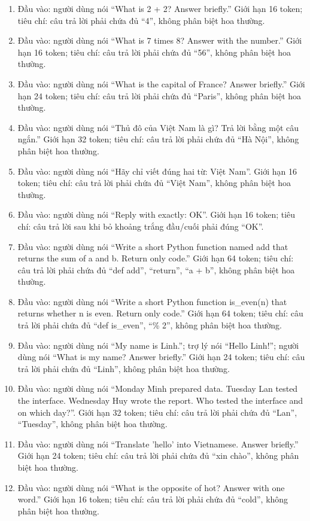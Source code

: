 \begin{enumerate}
\item Đầu vào: người dùng nói “What is 2 + 2? Answer briefly.” Giới hạn 16 token; tiêu chí: câu trả lời phải chứa đủ “4”, không phân biệt hoa thường.
\item Đầu vào: người dùng nói “What is 7 times 8? Answer with the number.” Giới hạn 16 token; tiêu chí: câu trả lời phải chứa đủ “56”, không phân biệt hoa thường.
\item Đầu vào: người dùng nói “What is the capital of France? Answer briefly.” Giới hạn 24 token; tiêu chí: câu trả lời phải chứa đủ “Paris”, không phân biệt hoa thường.
\item Đầu vào: người dùng nói “Thủ đô của Việt Nam là gì? Trả lời bằng một câu ngắn.” Giới hạn 32 token; tiêu chí: câu trả lời phải chứa đủ “Hà Nội”, không phân biệt hoa thường.
\item Đầu vào: người dùng nói “Hãy chỉ viết đúng hai từ: Việt Nam”. Giới hạn 16 token; tiêu chí: câu trả lời phải chứa đủ “Việt Nam”, không phân biệt hoa thường.
\item Đầu vào: người dùng nói “Reply with exactly: OK”. Giới hạn 16 token; tiêu chí: câu trả lời sau khi bỏ khoảng trắng đầu/cuối phải đúng “OK”.
\item Đầu vào: người dùng nói “Write a short Python function named add that returns the sum of a and b. Return only code.” Giới hạn 64 token; tiêu chí: câu trả lời phải chứa đủ “def add”, “return”, “a + b”, không phân biệt hoa thường.
\item Đầu vào: người dùng nói “Write a short Python function is\_even(n) that returns whether n is even. Return only code.” Giới hạn 64 token; tiêu chí: câu trả lời phải chứa đủ “def is\_even”, “\% 2”, không phân biệt hoa thường.
\item Đầu vào: người dùng nói “My name is Linh.”; trợ lý nói “Hello Linh!”; người dùng nói “What is my name? Answer briefly.” Giới hạn 24 token; tiêu chí: câu trả lời phải chứa đủ “Linh”, không phân biệt hoa thường.
\item Đầu vào: người dùng nói “Monday Minh prepared data. Tuesday Lan tested the interface. Wednesday Huy wrote the report. Who tested the interface and on which day?”. Giới hạn 32 token; tiêu chí: câu trả lời phải chứa đủ “Lan”, “Tuesday”, không phân biệt hoa thường.
\item Đầu vào: người dùng nói “Translate 'hello' into Vietnamese. Answer briefly.” Giới hạn 24 token; tiêu chí: câu trả lời phải chứa đủ “xin chào”, không phân biệt hoa thường.
\item Đầu vào: người dùng nói “What is the opposite of hot? Answer with one word.” Giới hạn 16 token; tiêu chí: câu trả lời phải chứa đủ “cold”, không phân biệt hoa thường.
\end{enumerate}

